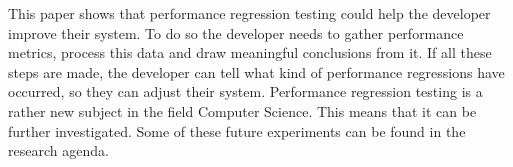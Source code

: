 This paper shows that performance regression testing could help the developer improve their system. To do so the developer needs to gather performance metrics, process this data and draw meaningful conclusions from it. If all these steps are made, the developer can tell what kind of performance regressions have occurred, so they can adjust their system. Performance regression testing is a rather new subject in the field Computer Science. This means that it can be further investigated. Some of these future experiments can be found in the research agenda.
